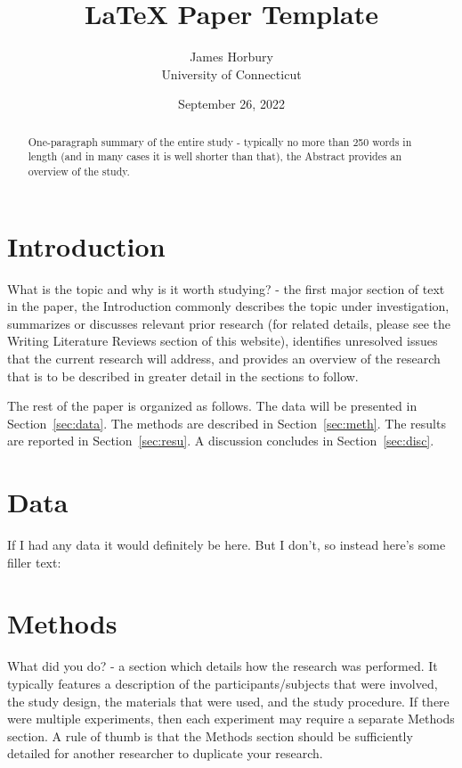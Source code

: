 \documentclass[12pt]{article}
\title{LaTeX Paper Template}
\author{James Horbury\\
    University of Connecticut
}
\date{September 26, 2022}
\begin{document}
\maketitle

\begin{abstract}
One-paragraph summary of the entire study - typically no more than 250 words in length (and in many cases it is well shorter than that), the Abstract provides an overview of the study.
\end{abstract}

\section*{Introduction}
\label{sec:intro}

What is the topic and why is it worth studying? - the first major section of text in the paper, the Introduction commonly describes the topic under investigation, summarizes or discusses relevant prior research (for related details, please see the Writing Literature Reviews section of this website), identifies unresolved issues that the current research will address, and provides an overview of the research that is to be described in greater detail in the sections to follow.

\lipsum[1-3]

The rest of the paper is organized as follows.
The data will be presented in Section~\ref{sec:data}.
The methods are described in Section~\ref{sec:meth}.
The results are reported in Section~\ref{sec:resu}.
A discussion concludes in Section~\ref{sec:disc}.

\section*{Data}
\label{sec:data}

If I had any data it would definitely be here. But I don't, so instead here's some filler text:

\lipsum[1]

\section*{Methods}
\label{sec:meth}

What did you do? - a section which details how the research was performed.  It typically features a description of the participants/subjects that were involved, the study design, the materials that were used, and the study procedure.  If there were multiple experiments, then each experiment may require a separate Methods section.  A rule of thumb is that the Methods section should be sufficiently detailed for another researcher to duplicate your research.
\end{document}
